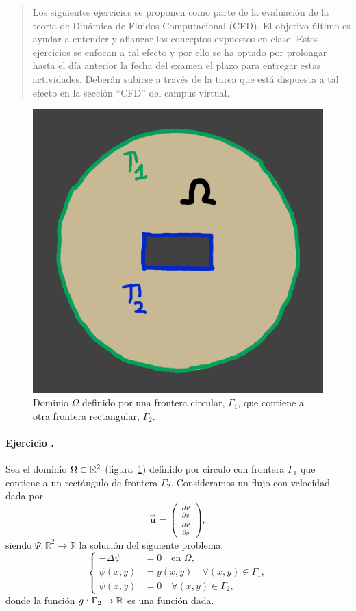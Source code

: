 \documentclass[11pt]{article}
\title{\cabecera}
\author{}
\date{}
\newcounter{actividad}
\newcommand{\actividad}[1]{
  \stepcounter{actividad}
  \paragraph*{Ejercicio \theactividad. #1}
  }
\newcommand{\Vector}[1]{\ensuremath{\vec{\mathbf{#1}}}}
\renewcommand{\uu}{\Vector{u}}
\begin{document}
\maketitle

\begin{quotation}\small
  Los siguientes ejercicios se proponen como parte de la evaluación de
  la teoría de Dinámica de Fluidos Computacional (CFD).  El objetivo
  último es ayudar a entender y afianzar los conceptos expuestos en
  clase. Estos ejercicios se enfocan a tal efecto y por ello se ha
  optado por prolongar hasta el día anterior la fecha del examen el
  plazo para entregar estas actividades.  Deberán subirse a través de
  la tarea que está dispuesta a tal efecto en la sección ``CFD'' del
  campus virtual.
\end{quotation}

\begin{figure}
  \centering
  \includegraphics[width=0.25\linewidth]{dominio-circ-rect}
  \caption{Dominio $\Omega$ definido por una frontera circular,
     $\Gamma_1$, que contiene a otra frontera rectangular, $\Gamma_2$.}
  \label{dominio1}
\end{figure}

\actividad{} Sea el dominio $\Omega\subset{\mathbb R}^2$
(figura~\ref{dominio1}) definido por círculo con frontera
$\Gamma_1$ que contiene a un rectángulo de frontera
$\Gamma_2$. Consideramos un flujo con velocidad dada por
$$
\uu=\begin{pmatrix}
  \frac{\partial\Psi}{\partial x}
  \\[0.5em]
  \frac{\partial\Psi}{\partial y}
\end{pmatrix},
$$
siendo $\Psi:\mathbb R^2 \to \mathbb R$ la solución del siguiente problema:
\begin{equation}
  \begin{cases}
    -\Delta\psi &=0 \quad\text{en } \Omega,
    \\
    \psi(x,y)&=g(x,y) \quad\forall (x,y)\in\Gamma_1,
    \\
    \psi(x,y)&=0 \quad\forall (x,y)\in\Gamma_2,
  \end{cases}
  \label{eq:psi.dirichlet}
\end{equation}
donde la función $g:\Gamma_2\to{\mathbb R}$ es una función dada.
\end{document}
